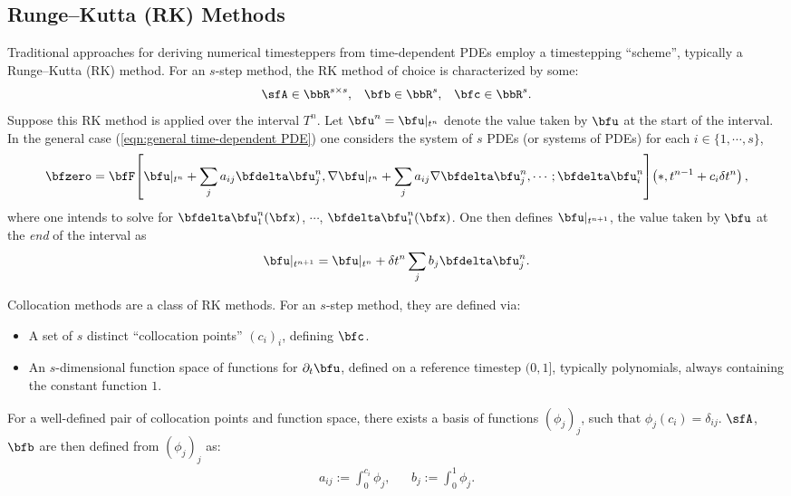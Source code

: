 \subsection*{Runge--Kutta (RK) Methods}\label{cha:RK methods}
    Traditional approaches for deriving numerical timesteppers from time-dependent PDEs employ a timestepping ``scheme'', typically a Runge--Kutta (RK) method. For an $s$-step method, the RK method of choice is characterized by some:
    \begin{align}
        \sfA  \in  \bbR^{s \times s},  &&
        \bfb  \in  \bbR^{s},  &&
        \bfc  \in  \bbR^{s}.
    \end{align}
    Suppose this RK method is applied over the interval $T^{n}$. Let $\bfu^{n}  =  \bfu|_{t^{n}}$ denote the value taken by $\bfu$ at the start of the interval. In the general case (\ref{eqn:general time-dependent PDE}) one considers the system of $s$ PDEs (or systems of PDEs) for each $i  \in  \{1, \cdots, s\}$, 
    \begin{equation}
        \bfzero  =  \bfF\!\left[\bfu|_{t^{n}} + \sum_{j}a_{ij}\bfdelta\bfu^{n}_{j}, \nabla\bfu|_{t^{n}} + \sum_{j}a_{ij}\nabla\bfdelta\bfu^{n}_{j}, \cdots; \bfdelta\bfu^{n}_{i}\right]\!\left(*, t^{n - 1} + c_{i}\delta t^{n}\right),
    \end{equation}
    where one intends to solve for $\bfdelta\bfu^{n}_{1}(\bfx)$, $\cdots$, $\bfdelta\bfu^{n}_{1}(\bfx)$. One then defines $\bfu|_{t^{n + 1}}$, the value taken by $\bfu$ at the \emph{end} of the interval as
    \begin{equation}
        \bfu|_{t^{n + 1}}  =  \bfu|_{t^{n}} + \delta t^{n}\sum_{j}b_{j}\bfdelta\bfu^{n}_{j}.
    \end{equation}

    \line
    
    \begin{definition}
        Collocation methods are a class of RK methods. For an $s$-step method, they are defined via:
        \begin{itemize}
            \item  A set of $s$ distinct ``collocation points'' $(c_{i})_{i}$, defining $\bfc$.
            \item  An $s$-dimensional function space of functions for $\partial_{t}\bfu$, defined on a reference timestep $(0, 1]$, typically polynomials, always containing the constant function $1$.
        \end{itemize}
        For a well-defined pair of collocation points and function space, there exists a basis of functions $(\phi_{j})_{j}$, such that $\phi_{j}(c_{i})  =  \delta_{ij}$. $\sfA$, $\bfb$ are then defined from $(\phi_{j})_{j}$ as:
        \begin{align}
            a_{ij}  :=  \int_{0}^{c_{i}}\phi_{j},  &&
            b_{j}   :=  \int_{0}^{1}\phi_{j}.
        \end{align}
    \end{definition}
    
